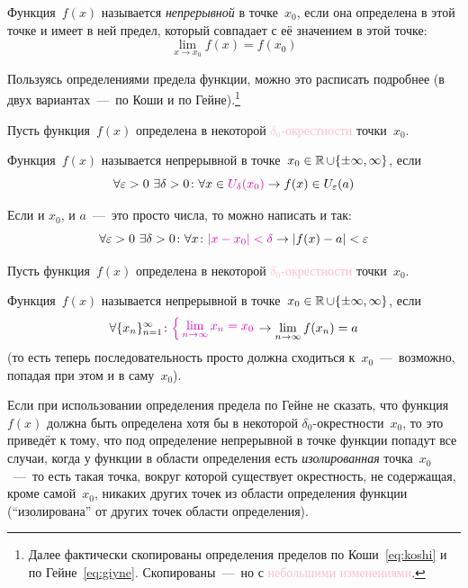 \documentclass[a4paper,12pt]{article}
\begin{document}
  Функция~$f(x)$ называется \emph{непрерывной} в точке~$x_0$, если она определена в этой точке и имеет в ней предел, который совпадает с её значением в этой точке:
  \[
    \lim_{x \to x_0} f(x) = f(x_0)
  \]

  Пользуясь определениями предела функции, можно это расписать подробнее (в двух вариантах~---~по Коши и по Гейне).\footnote{
    Далее фактически скопированы определения пределов по Коши~\eqref{eq:koshi} и по Гейне~\eqref{eq:giyne}.
    Скопированы~---~но с \textcolor{pink}{небольшими изменениями}.
  }

  \begin{definition}
    Пусть функция~$f(x)$ определена в некоторой \textcolor{pink}{$\delta_0$-окрестности} точки~$x_0$.

    Функция~$f(x)$ называется непрерывной в точке~$x_0 \hm\in \RR \hm\cup \{\pm \infty, \infty\}$, если
    \begin{equation}
      \forall \eps > 0\ \exists \delta > 0\colon \forall x \in \textcolor{pink}{U_{\delta}(x_0)} \to f(x) \in U_{\eps}(a)
    \end{equation}

    Если и $x_0$, и $a$~---~это просто числа, то можно написать и так:
    \[
      \forall \eps > 0\ \exists \delta > 0\colon \forall x\colon \textcolor{pink}{|x - x_0| < \delta} \to |f(x) - a| < \eps
    \]
  \end{definition}

  \begin{definition}
    Пусть функция~$f(x)$ определена в некоторой \textcolor{pink}{$\delta_0$-окрестности} точки~$x_0$.

    Функция~$f(x)$ называется непрерывной в точке~$x_0 \hm\in \RR \hm\cup \{\pm \infty, \infty\}$, если
    \begin{equation}
      \forall \{x_n\}_{n=1}^{\infty}\colon \textcolor{pink}{\left\{
        \begin{aligned}
          &\lim_{n \to \infty} x_n = x_0\\
        \end{aligned}
      \right.}
      \to \lim_{n \to \infty} f(x_n) = a
    \end{equation}
    (то есть теперь последовательность просто должна сходиться к~$x_0$~---~возможно, попадая при этом и в саму~$x_0$).
  \end{definition}

  \begin{remark}
    Если при использовании определения предела по Гейне не сказать, что функция~$f(x)$ должна быть определена хотя бы в некоторой $\delta_0$-окрестности~$x_0$, то это приведёт к тому, что под определение непрерывной в точке функции попадут все случаи, когда у функции в области определения есть \emph{изолированная} точка~$x_0$~---~то есть такая точка, вокруг которой существует окрестность, не содержащая, кроме самой~$x_0$, никаких других точек из области определения функции (``изолирована'' от других точек области определения).
  \end{remark}
\end{document}
